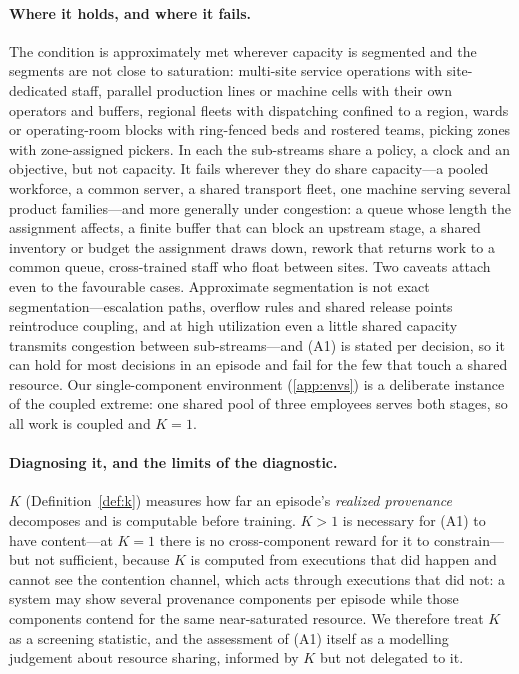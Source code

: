 \documentclass[review,authoryear,3p,times]{elsarticle}
\begin{document}
\paragraph{Where it holds, and where it fails.} The condition is approximately
met wherever capacity is segmented and the segments are not close to saturation:
multi-site service operations with site-dedicated staff, parallel production
lines or machine cells with their own operators and buffers, regional fleets
with dispatching confined to a region, wards or operating-room blocks with
ring-fenced beds and rostered teams, picking zones with zone-assigned pickers.
In each the sub-streams share a policy, a clock and an objective, but not
capacity. It fails wherever they do share capacity---a pooled workforce, a
common server, a shared transport fleet, one machine serving several product
families---and more generally under congestion: a queue whose length the
assignment affects, a finite buffer that can block an upstream stage, a shared
inventory or budget the assignment draws down, rework that returns work to a
common queue, cross-trained staff who float between sites. Two caveats attach
even to the favourable cases. Approximate segmentation is not exact
segmentation---escalation paths, overflow rules and shared release points
reintroduce coupling, and at high utilization even a little shared capacity
transmits congestion between sub-streams---and (A1) is stated per decision, so
it can hold for most decisions in an episode and fail for the few that touch a
shared resource. Our single-component environment (\ref{app:envs}) is a
deliberate instance of the coupled extreme: one shared pool of three employees
serves both stages, so all work is coupled and $K=1$.

\paragraph{Diagnosing it, and the limits of the diagnostic.} $K$
(Definition~\ref{def:k}) measures how far an episode's \emph{realized
provenance} decomposes and is computable before training. $K>1$ is necessary for
(A1) to have content---at $K=1$ there is no cross-component reward for it to
constrain---but not sufficient, because $K$ is computed from executions that did
happen and cannot see the contention channel, which acts through executions that
did not: a system may show several provenance components per episode while those
components contend for the same near-saturated resource. We therefore treat $K$
as a screening statistic, and the assessment of (A1) itself as a modelling
judgement about resource sharing, informed by $K$ but not delegated to it.
\end{document}
